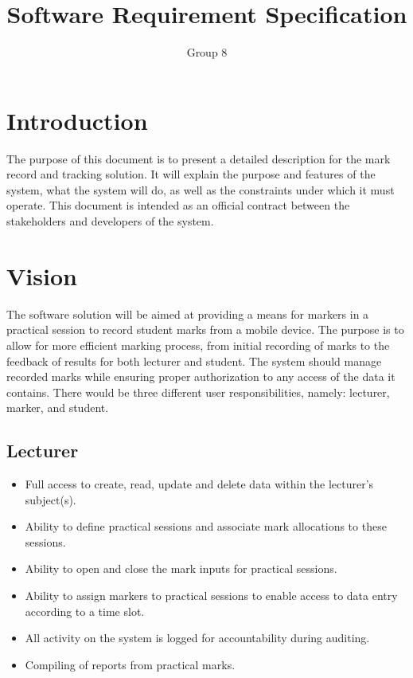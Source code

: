 \documentclass[a4paper]{article}
\begin{document}
\title{\Huge{Software Requirement Specification}}
\author{Group 8}
\maketitle

\section{Introduction}

The purpose of this document is to present a detailed description for the mark record and tracking solution. It will explain the purpose and features of the system, what the system will do, as well as the constraints under which it must operate. This document is intended as an official contract between the stakeholders and developers of the system.

\section{Vision}

The software solution will be aimed at providing a means for markers in a practical session to record student marks from a mobile device. The purpose is to allow for more efficient marking process, from initial recording of marks to the feedback of results for both lecturer and student. The system should manage recorded marks while ensuring proper authorization to any access of the data it contains. There would be three different user responsibilities, namely: lecturer, marker, and student.

\subsection{Lecturer}
\begin{itemize}
\item	Full access to create, read, update and delete data within the lecturer's subject(s).
\item	Ability to define practical sessions and associate mark allocations to these sessions.
\item	Ability to open and close the mark inputs for practical sessions.
\item	Ability to assign markers to practical sessions to enable access to data entry according to a time slot.
\item	All activity on the system is logged for accountability during auditing.
\item	Compiling of reports from practical marks.
\end{itemize}
\end{document}
